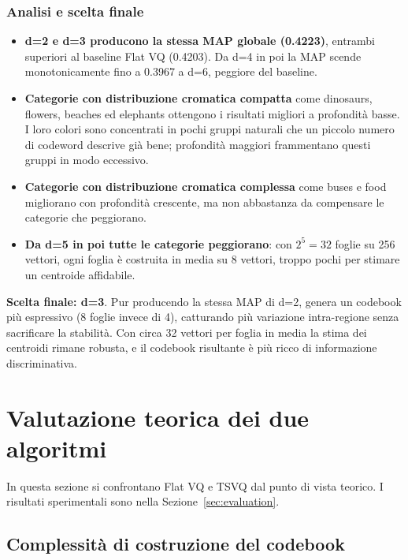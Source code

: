 \documentclass[12pt, a4paper]{article}
\begin{document}
\subsubsection{Analisi e scelta finale}

\begin{itemize}
    \item \textbf{d=2 e d=3 producono la stessa MAP globale (0.4223)}, entrambi superiori
          al baseline Flat VQ (0.4203). Da d=4 in poi la MAP scende monotonicamente fino a
          0.3967 a d=6, peggiore del baseline.
    \item \textbf{Categorie con distribuzione cromatica compatta} come dinosaurs, flowers,
          beaches ed elephants ottengono i risultati migliori a profondità basse. I loro
          colori sono concentrati in pochi gruppi naturali che un piccolo numero di codeword
          descrive già bene; profondità maggiori frammentano questi gruppi in modo eccessivo.
    \item \textbf{Categorie con distribuzione cromatica complessa} come buses e food
          migliorano con profondità crescente, ma non abbastanza da compensare le categorie
          che peggiorano.
    \item \textbf{Da d=5 in poi tutte le categorie peggiorano}: con $2^5=32$ foglie su 256
          vettori, ogni foglia è costruita in media su 8 vettori, troppo pochi per stimare
          un centroide affidabile.
\end{itemize}

\textbf{Scelta finale: d=3}. Pur producendo la stessa MAP di d=2, genera un codebook più
espressivo (8 foglie invece di 4), catturando più variazione intra-regione senza sacrificare
la stabilità. Con circa 32 vettori per foglia in media la stima dei centroidi rimane robusta,
e il codebook risultante è più ricco di informazione discriminativa.

\section{Valutazione teorica dei due algoritmi}
\label{sec:valutazione}

In questa sezione si confrontano Flat VQ e TSVQ dal punto di vista teorico. I risultati
sperimentali sono nella Sezione~\ref{sec:evaluation}.

\subsection{Complessità di costruzione del codebook}
\end{document}
